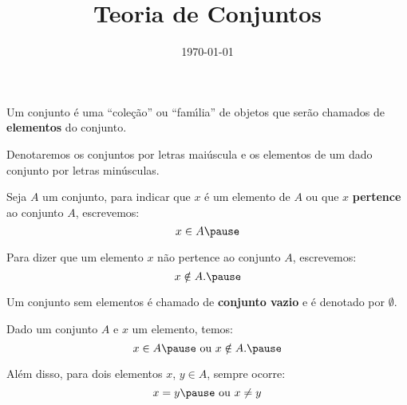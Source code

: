 \documentclass{beamer}
\title{Teoria de Conjuntos}
\author[\autor]{\autor}
\institute[\instituto]{\instituto}
\date{\today}
\begin{document}
    \begin{frame}
        \maketitle
    \end{frame}


    \begin{frame}
        \vspace{.4cm}
        Um conjunto {\'e} uma ``cole{\c c}{\~a}o'' ou ``fam{\'\i}lia'' de objetos que ser\~ao chamados de \textbf{elementos} do conjunto.\pause

        \vspace{.4cm}

        Denotaremos os conjuntos por letras mai\'uscula e os elementos de um dado conjunto por letras min{\'u}sculas.\pause

        \vspace{.4cm}
        Seja $A$ um conjunto, para indicar que $x$ {\'e} um elemento de $A$ ou que $x$ \textbf{pertence} ao conjunto $A$, \pause escrevemos:
        \[
            x \in A\pause
        \]

        Para dizer que um elemento $x$ n{\~a}o pertence ao conjunto $A$, escrevemos:
        \[
            x \notin A.\pause
        \]
    \end{frame}

    \begin{frame}
        Um conjunto sem elementos {\'e} chamado de \textbf{conjunto vazio} e {\'e} denotado por $\emptyset$.\pause
        
        \vspace{.4cm}
        Dado um conjunto $A$ e $x$ um elemento, temos:\pause
        \[
            x \in A\pause \mbox{ ou } x \notin A.\pause
        \]

        Al{\'e}m disso, para dois elementos $x$, $y \in A$, sempre ocorre:\pause
        \[
            x = y\pause \mbox{ ou } x \neq y
        \]
    \end{frame}
\end{document}

